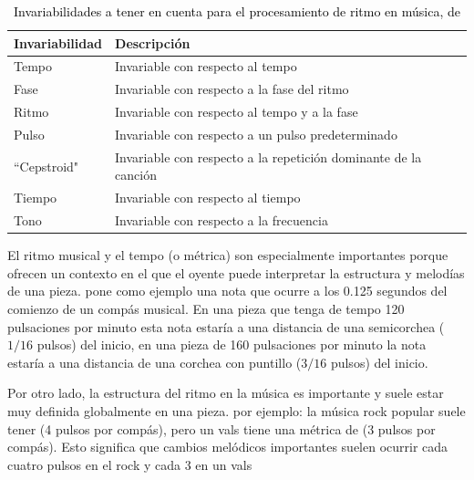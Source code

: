\begin{table}
\centering
\begin{tabular}{ll}
\hline
\textbf{Invariabilidad} & \textbf{Descripción}                                                  \\ \hline
Tempo                   & Invariable con respecto al tempo                                      \\
Fase                    & Invariable con respecto a la fase del ritmo \\
Ritmo                   & Invariable con respecto al tempo y a la fase                          \\
Pulso                   & Invariable con respecto a un pulso predeterminado                     \\
``Cepstroid"            & Invariable con respecto a la repetición dominante de la canción  \\
Tiempo                  & Invariable con respecto al tiempo                                     \\
Tono                    & Invariable con respecto a la frecuencia                               \\ \hline
\end{tabular}
\caption{\textcolor{black}{Invariabilidades a tener en cuenta para el procesamiento de ritmo en música, de \cite{DBLP:journals/corr/abs-1804-08167}}}
\label{tab:invariance_rythms}
\end{table}

El ritmo musical y el tempo (o métrica) son especialmente importantes porque ofrecen un contexto en el que el oyente puede interpretar la estructura y melodías de una pieza. \cite{DBLP:journals/corr/abs-1804-08167} pone como ejemplo una nota que ocurre a los 0.125 segundos del comienzo de un compás musical. En una pieza que tenga de tempo 120 pulsaciones por minuto esta nota estaría a una distancia de una semicorchea ($1/16$ pulsos) del inicio, en una pieza de 160 pulsaciones por minuto la nota estaría a una distancia de una corchea con puntillo ($3/16$ pulsos) del inicio. 

Por otro lado, la estructura del ritmo en la música es importante y suele estar muy definida globalmente en una pieza. por ejemplo: la música rock popular suele tener  (4 pulsos por compás), pero un vals tiene una métrica de  (3 pulsos por compás). Esto significa que cambios melódicos importantes suelen ocurrir cada cuatro pulsos en el rock y cada 3 en un vals \citep{eck:temporalstructure:2002}


